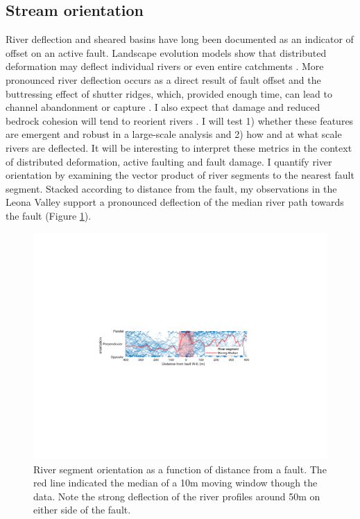 \documentclass[12pt, notitlepage]{report}
\begin{document}
\subsection{Stream orientation} 

River deflection and sheared basins have long been documented as an indicator of offset on an active fault. Landscape evolution models show that distributed deformation may deflect individual rivers or even entire catchments \cite{Gray2018Off-faultDrainages}. More pronounced river deflection occurs as a direct result of fault offset and the buttressing effect of shutter ridges, which, provided enough time, can lead to channel abandonment or capture \cite{DuvallDynamicEnvironment, Zielke2015FaultData}. I also expect that damage and reduced bedrock cohesion will tend to reorient rivers \cite{Roy2016}. I will test 1) whether these features are emergent and robust in a large-scale analysis and 2) how and at what scale rivers are deflected. It will be interesting to interpret these metrics in the context of distributed deformation, active faulting and fault damage. I quantify river orientation by examining the vector product of river segments to the nearest fault segment. Stacked according to distance from the fault, my observations in the Leona Valley support a pronounced deflection of the median river path towards the fault (Figure \ref{fig:river_deflection}).
%
\begin{figure}
    \centering
    \includegraphics[scale=1]{figures/river_defelction.pdf}
    \caption{River segment orientation as a function of distance from a fault. The red line indicated the median of a 10m moving window though the data. Note the strong deflection of the river profiles around 50m on either side of the fault.}
    \label{fig:river_deflection}
\end{figure}
%
\end{document}
